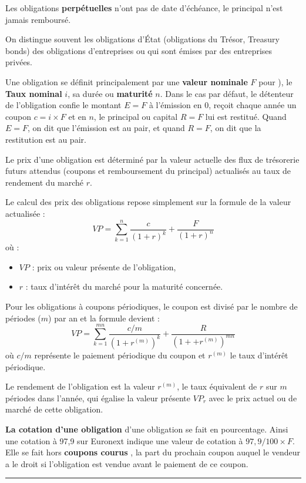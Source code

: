 \begin{f}
Les obligations \textbf{perpétuelles} n'ont pas de date d'échéance, le principal n'est jamais remboursé.
 
On distingue souvent les obligations d'État (obligations du Trésor, Treasury bonds) des
 obligations d'entreprises ou  qui sont émises par des entreprises privées.



Une obligation se définit principalement par une \textbf{valeur nominale} \(F\) pour ), le \textbf{Taux nominal} \(i\), sa durée ou \textbf{maturité} \(n\).
Dans le cas par défaut, le détenteur de l'obligation confie  le montant \(E=F\) à l'émission en 0, reçoit chaque année un coupon \(c=i\times F\) et en \(n\), le principal ou capital \(R=F\) lui est restitué.
Quand \(E=F\), on dit que l'émission est au pair, et quand \(R=F\), on dit que la restitution est au pair.


Le prix d'une obligation est déterminé par la valeur actuelle des flux de trésorerie futurs attendus (coupons et remboursement du principal) actualisés au taux de rendement du marché \(r\).

Le calcul des prix des obligations repose simplement sur la formule de la valeur actualisée :
\[
VP = \sum_{k=1}^{n} \frac{c}{(1 + r)^k} + \frac{F}{(1 + r)^n}
 \]
où :
\begin{itemize}
	\item \(VP\) : prix ou valeur présente de l'obligation,
	\item \(r\) : taux d'intérêt du marché pour la maturité concernée.
\end{itemize}


Pour les obligations à coupons périodiques, le coupon est divisé par le nombre de périodes (\(m\)) par an et la formule devient :
\[ 
VP = \sum_{k=1}^{mn} \frac{c/m}{(1 + r^{(m)})^k} + \frac{R}{(1 + + r^{(m)})^{mn}}
 \]
 où \(c/m\) représente le paiement périodique du coupon et \( r^{(m)}\) le taux d'intérêt périodique.

Le rendement de l'obligation est la valeur \( r^{(m)}\), le taux équivalent de \(r\) sur \(m\) périodes dans l'année,  qui égalise la valeur présente \(VP_r\) avec le prix actuel ou de marché de cette obligation. 

\textbf{La cotation d'une obligation} d'une obligation se fait en pourcentage. Ainsi une cotation à 97,9  sur Euronext indique une valeur de cotation à \(97,9 /100\times F\). 
Elle  se fait hors \textbf{coupons courus} , la part du prochain coupon auquel le vendeur a le droit si l'obligation est vendue avant le paiement de ce coupon.
\end{f}
\hrule

